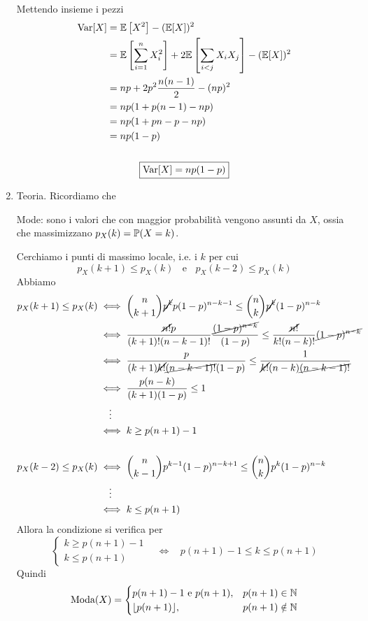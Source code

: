 \begin{enumerate}
Mettendo insieme i pezzi
\begin{gather*}
\begin{aligned}
\operatorname{Var}[ X] & =\mathbb{E}\left[ X^{2}\right] -(\mathbb{E}[ X])^{2}\\
 & =\mathbb{E}\left[\sum\limits _{i=1}^{n} X_{i}^{2}\right] +2\mathbb{E}\left[\sum\limits _{i< j} X_{i} X_{j}\right] -(\mathbb{E}[ X])^{2}\\
 & =np+2p^{2}\frac{n(n-1)}{2} -(np)^{2}\\
 & =np(1+p(n-1) -np)\\
 & =np(1+pn-p-np)\\
 & =np(1-p)
\end{aligned}\\
\\
\boxed{\operatorname{Var}[ X] =np(1-p)}
\end{gather*}
\item Teoria. Ricordiamo che

Mode: sono i valori che con maggior probabilità vengono assunti da $X$, ossia che massimizzano $p_{X}(k) =\mathbb{P}(X=k)$.

Cerchiamo i punti di massimo locale, i.e. i $k$ per cui
\begin{equation*}
\boxed{p_{X}(k+1) \leq p_{X}(k) \ \ \ \ \text{e} \ \ \ \ p_{X}(k-2) \leq p_{X}(k)}
\end{equation*}
Abbiamo
\begin{align*}
p_{X}(k+1) \leq p_{X}(k) & \iff \binom{n}{k+1}\cancel{p^{k}} p(1-p)^{n-k-1} \leq \binom{n}{k}\cancel{p^{k}}(1-p)^{n-k}\\
 & \iff \frac{\cancel{n!} p}{(k+1) !(n-k-1) !}\frac{\cancel{(1-p)^{n-k}}}{(1-p)} \leq \frac{\cancel{n!}}{k!(n-k) !}\cancel{(1-p)^{n-k}}\\
 & \iff \frac{p}{(k+1)\cancel{k!}\cancel{(n-k-1) !}(1-p)} \leq \frac{1}{\cancel{k!}(n-k)\cancel{(n-k-1) !}}\\
 & \iff \frac{p(n-k)}{(k+1)(1-p)} \leq 1\\
 & \quad\vdots \\
 & \iff k\geq p(n+1) -1\\
 & \\
p_{X}(k-2) \leq p_{X}(k) & \iff \binom{n}{k-1} p^{k-1}(1-p)^{n-k+1} \leq \binom{n}{k} p^{k}(1-p)^{n-k}\\
 & \quad\vdots \\
 & \iff k\leq p(n+1)
\end{align*}
Allora la condizione si verifica per
\begin{equation*}
\begin{cases}
k\geq p(n+1) -1\\
k\leq p(n+1)
\end{cases}
 \ \ \ \ \iff \ \ \ \ p(n+1) -1\leq k\leq p(n+1)
\end{equation*}
Quindi
\begin{equation*}
\text{Moda}(X) =
\begin{cases}
p(n+1) -1\ \text{e} \ p(n+1) , & p(n+1) \in \mathbb{N}\\
\lfloor p(n+1)\rfloor , & p(n+1) \notin \mathbb{N}
\end{cases}
\end{equation*}
\end{enumerate}

